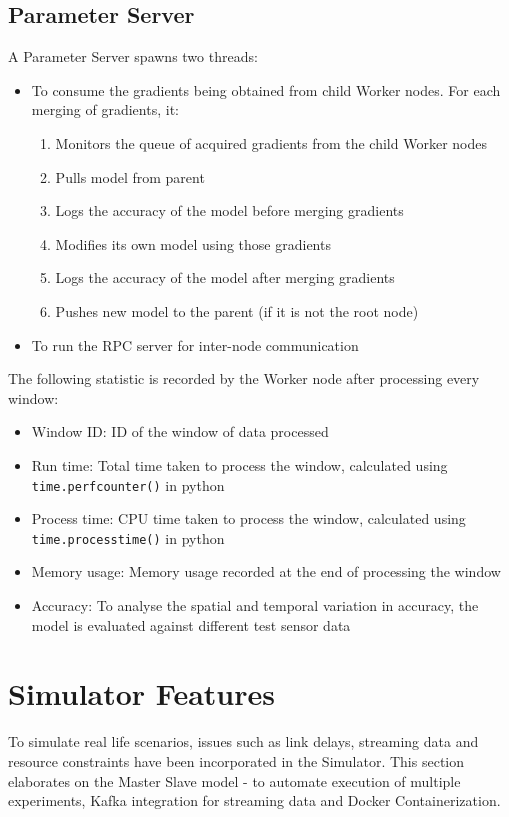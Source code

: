 \documentclass[a4paper, 12pt]{article}
\begin{document}
\subsection{Parameter Server}
A Parameter Server spawns two threads:
\begin{itemize}
    \item To consume the gradients being obtained from child Worker nodes. For each merging of gradients, it:
    \begin{enumerate}
        \item Monitors the queue of acquired gradients from the child Worker nodes
        \item Pulls model from parent 
        \item Logs the accuracy of the model before merging gradients
        \item Modifies its own model using those gradients
        \item Logs the accuracy of the model after merging gradients
        \item Pushes new model to the parent (if it is not the root node)
    \end{enumerate}
    \item To run the RPC server for inter-node communication
\end{itemize}

The following statistic is recorded by the Worker node after processing every window:
\begin{itemize}
    \item Window ID: ID of the window of data processed
    \item Run time: Total time taken to process the window, calculated using \texttt{time.perf\textunderscore counter()} in python
    \item Process time: CPU time taken to process the window, calculated using \texttt{time.process\textunderscore time()} in python
    \item Memory usage: Memory usage recorded at the end of processing the window
    \item Accuracy: To analyse the spatial and temporal variation in accuracy, the model is evaluated against different test sensor data 
\end{itemize}

\section{Simulator Features}
To simulate real life scenarios, issues such as link delays, streaming data and resource constraints have been incorporated in the Simulator. This section elaborates on the Master Slave model - to automate execution of multiple experiments, Kafka integration for streaming data and Docker Containerization.
\end{document}
